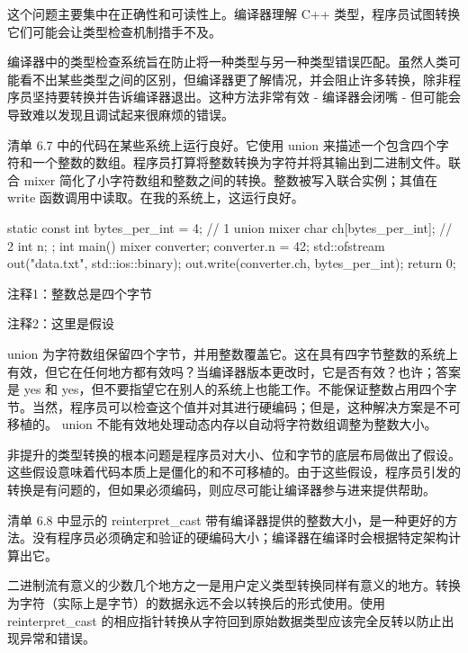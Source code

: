 这个问题主要集中在正确性和可读性上。编译器理解 C++ 类型，程序员试图转换它们可能会让类型检查机制措手不及。


编译器中的类型检查系统旨在防止将一种类型与另一种类型错误匹配。虽然人类可能看不出某些类型之间的区别，但编译器更了解情况，并会阻止许多转换，除非程序员坚持要转换并告诉编译器退出。这种方法非常有效 - 编译器会闭嘴 - 但可能会导致难以发现且调试起来很麻烦的错误。

清单 6.7 中的代码在某些系统上运行良好。它使用 union 来描述一个包含四个字符和一个整数的数组。程序员打算将整数转换为字符并将其输出到二进制文件。联合 mixer 简化了小字符数组和整数之间的转换。整数被写入联合实例；其值在 write 函数调用中读取。在我的系统上，这运行良好。


\begin{cpp}
static const int bytes_per_int = 4; // 1
  union mixer {
  char ch[bytes_per_int]; // 2
  int n;
};
int main() {
  mixer converter;
  converter.n = 42;
  std::ofstream out("data.txt", std::ios::binary);
  out.write(converter.ch, bytes_per_int);
  return 0;
}
\end{cpp}

{\footnotesize
注释1：整数总是四个字节

注释2：这里是假设
}


union 为字符数组保留四个字节，并用整数覆盖它。这在具有四字节整数的系统上有效，但它在任何地方都有效吗？当编译器版本更改时，它是否有效？也许；答案是 yes 和 yes，但不要指望它在别人的系统上也能工作。不能保证整数占用四个字节。当然，程序员可以检查这个值并对其进行硬编码；但是，这种解决方案是不可移植的。
union 不能有效地处理动态内存以自动将字符数组调整为整数大小。


非提升的类型转换的根本问题是程序员对大小、位和字节的底层布局做出了假设。这些假设意味着代码本质上是僵化的和不可移植的。由于这些假设，程序员引发的转换是有问题的，但如果必须编码，则应尽可能让编译器参与进来提供帮助。

清单 6.8 中显示的 reinterpret\_cast 带有编译器提供的整数大小，是一种更好的方法。没有程序员必须确定和验证的硬编码大小；编译器在编译时会根据特定架构计算出它。

二进制流有意义的少数几个地方之一是用户定义类型转换同样有意义的地方。转换为字符（实际上是字节）的数据永远不会以转换后的形式使用。使用 reinterpret\_cast 的相应指针转换从字符回到原始数据类型应该完全反转以防止出现异常和错误。

